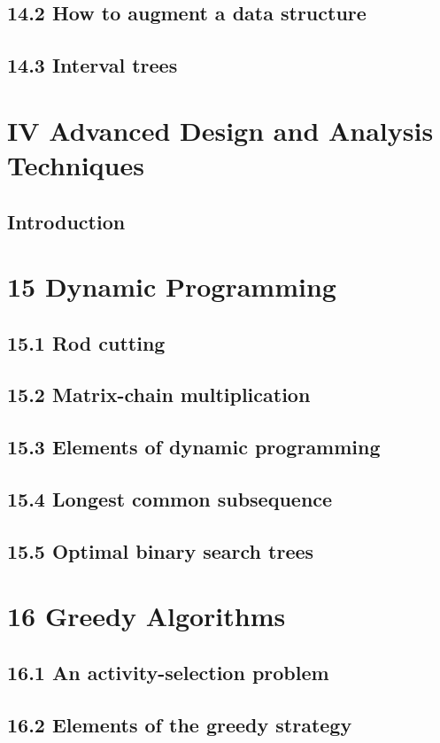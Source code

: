 \documentclass[a4paper]{article}
\begin{document}
\subsection{14.2 How to augment a data structure}
\subsection{14.3 Interval trees}

\newpage
\section{IV Advanced Design and Analysis Techniques}
\subsection{Introduction}

\newpage
\section{15 Dynamic Programming}
\subsection{15.1 Rod cutting}
\subsection{15.2 Matrix-chain multiplication}
\subsection{15.3 Elements of dynamic programming}
\subsection{15.4 Longest common subsequence}
\subsection{15.5 Optimal binary search trees}

\newpage
\section{16 Greedy Algorithms}
\subsection{16.1 An activity-selection problem}
\subsection{16.2 Elements of the greedy strategy}
\end{document}
